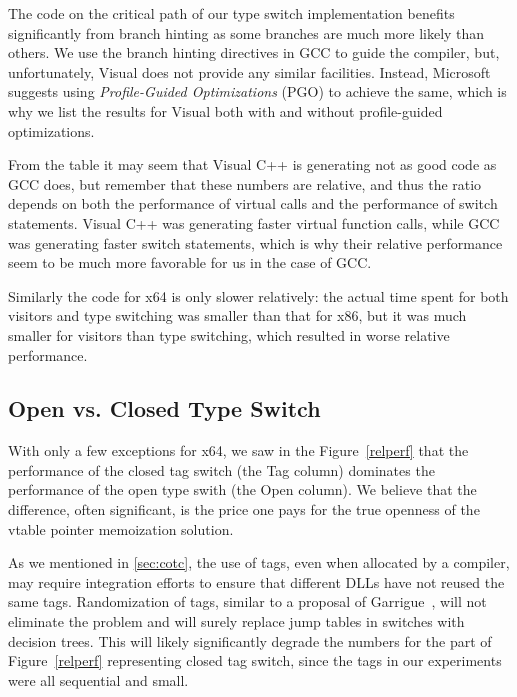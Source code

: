 The code on the critical path of our type switch implementation benefits 
significantly from branch hinting as some branches are much more likely than 
others. We use the branch hinting directives in GCC to guide the compiler, but, 
unfortunately, Visual \Cpp{} does not provide any similar facilities. Instead, 
Microsoft suggests using \emph{Profile-Guided Optimizations} (PGO) to achieve 
the same, which is why we list the results for Visual \Cpp{} both with and without 
profile-guided optimizations.

From the table it may seem that Visual C++ is generating not as good code as GCC 
does, but remember that these numbers are relative, and thus the ratio depends on  
both the performance of virtual calls and the performance of switch statements. Visual 
C++ was generating faster virtual function calls, while GCC was generating 
faster switch statements, which is why their relative performance seem to be much 
more favorable for us in the case of GCC.

Similarly the code for x64 is only slower relatively: the actual time spent for 
both visitors and type switching was smaller than that for x86, but it was much 
smaller for visitors than type switching, which resulted in worse relative 
performance.

\subsection{Open vs. Closed Type Switch}
\label{sec:cmp}

With only a few exceptions for x64, we saw in the Figure~\ref{relperf} that the 
performance of the closed tag switch (the Tag column) dominates the performance of the open type
swith (the Open column). We believe that the difference, often significant, is the price one pays 
for the true openness of the vtable pointer memoization solution.

As we mentioned in \textsection\ref{sec:cotc}, the use of tags, even when allocated 
by a compiler, may require integration efforts to ensure that different DLLs have 
not reused the same tags. Randomization of tags, similar to a proposal of 
Garrigue~\cite{garrigue-98}, will not eliminate the problem and will surely 
replace jump tables in switches with decision trees. This will likely 
significantly degrade the numbers for the part of Figure~\ref{relperf} 
representing closed tag switch, since the tags in our experiments were all 
sequential and small. 

